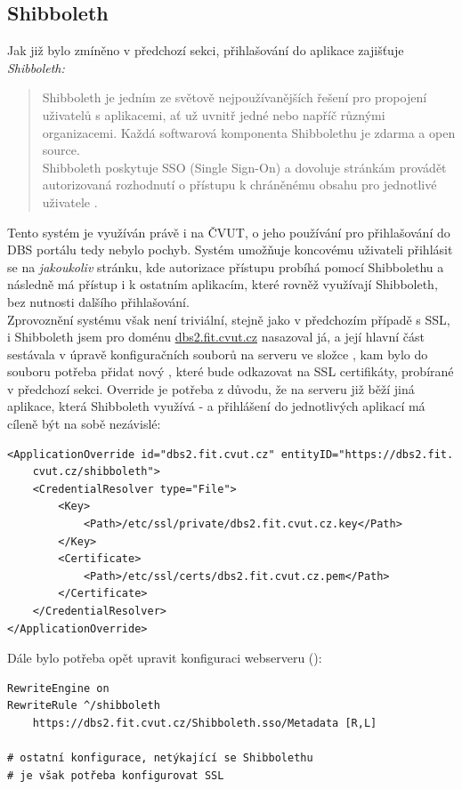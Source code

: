 \subsection{Shibboleth} \label{app:shibboleth}

Jak již bylo zmíněno v předchozí sekci, přihlašování do aplikace zajišťuje \emph{Shibboleth:}
\begin{quote}
Shibboleth je jedním ze světově nejpoužívanějších řešení pro propojení uživatelů s aplikacemi, ať už uvnitř jedné nebo napříč různými organizacemi. Každá softwarová komponenta Shibbolethu je zdarma a open source.\\
Shibboleth poskytuje SSO (Single Sign-On) a dovoluje stránkám provádět autorizovaná rozhodnutí o přístupu k chráněnému obsahu pro jednotlivé uživatele \cite{shibboleth}.
\end{quote}
Tento systém je využíván právě i na ČVUT, o jeho používání pro přihlašování do DBS portálu tedy nebylo pochyb. Systém umožňuje koncovému uživateli přihlásit se na \emph{jakoukoliv} stránku, kde autorizace přístupu probíhá pomocí Shibbolethu a následně má přístup i k ostatním aplikacím, které rovněž využívají Shibboleth, bez nutnosti dalšího přihlašování.\\
Zprovoznění systému však není triviální, stejně jako v předchozím případě s SSL, i Shibboleth jsem pro doménu \url{dbs2.fit.cvut.cz} nasazoval já, a její hlavní část sestávala v úpravě konfiguračních souborů na serveru ve složce , kam bylo do souboru  potřeba přidat nový , které bude odkazovat na SSL certifikáty, probírané v předchozí sekci. Override je potřeba z důvodu, že na serveru již běží jiná aplikace, která Shibboleth využívá -  a přihlášení do jednotlivých aplikací má cíleně být na sobě nezávislé:
\begin{verbatim}
<ApplicationOverride id="dbs2.fit.cvut.cz" entityID="https://dbs2.fit.
    cvut.cz/shibboleth">
    <CredentialResolver type="File">
        <Key>
            <Path>/etc/ssl/private/dbs2.fit.cvut.cz.key</Path>
        </Key>
        <Certificate>
            <Path>/etc/ssl/certs/dbs2.fit.cvut.cz.pem</Path>
        </Certificate>
    </CredentialResolver>
</ApplicationOverride>
\end{verbatim}
Dále bylo potřeba opět upravit konfiguraci webserveru ():
\expandafter\def\csname PY@tok@err\endcsname{} %
\begin{verbatim}
RewriteEngine on
RewriteRule ^/shibboleth
    https://dbs2.fit.cvut.cz/Shibboleth.sso/Metadata [R,L] 

# ostatní konfigurace, netýkající se Shibbolethu
# je však potřeba konfigurovat SSL
\end{verbatim}
